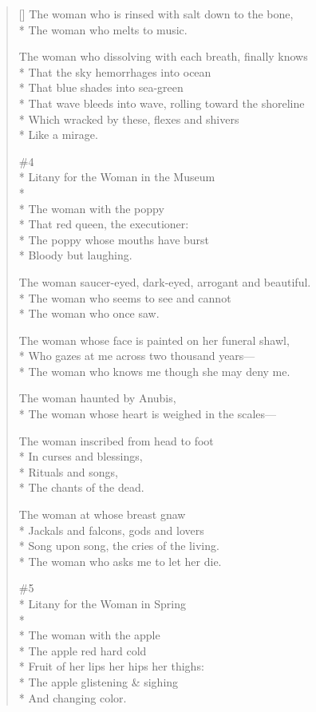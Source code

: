 \begin{verse}[\versewidth]
The woman who is rinsed with salt down to the bone,\\*
The woman who melts to music.

The woman who dissolving with each breath, finally knows\\*
That the sky hemorrhages into ocean\\*
That blue shades into sea-green\\*
That wave bleeds into wave, rolling toward the shoreline\\*
Which wracked by these, flexes and shivers\\*
Like a mirage.

\#4\\*
Litany for the Woman in the Museum\\*
~\\*
The woman with the poppy\\*
That red queen, the executioner:\\*
The poppy whose mouths have burst\\*
Bloody but laughing.

The woman saucer-eyed, dark-eyed, arrogant and beautiful.\\*
The woman who seems to see and cannot\\*
The woman who once saw.

The woman whose face is painted on her funeral shawl,\\*
Who gazes at me across two thousand years---\\*
The woman who knows me though she may deny me.

The woman haunted by Anubis,\\*
The woman whose heart is weighed in the scales---

The woman inscribed from head to foot\\*
In curses and blessings,\\*
Rituals and songs,\\*
The chants of the dead.

The woman at whose breast gnaw\\*
Jackals and falcons, gods and lovers\\*
Song upon song, the cries of the living.\\*
The woman who asks me to let her die.

\#5\\*
Litany for the Woman in Spring\\*
~\\*
The woman with the apple\\*
The apple red hard cold\\*
Fruit of her lips her hips her thighs:\\*
The apple glistening \& sighing\\*
And changing color.


\end{verse}
